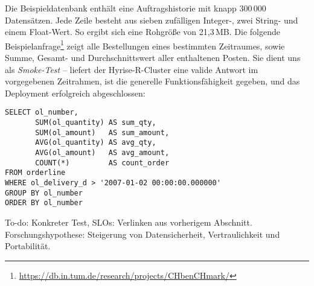 Die Beispieldatenbank enthält eine Auftragshistorie mit knapp 300\,000 Datensätzen. Jede Zeile besteht aus sieben zufälligen Integer-, zwei String- und einem Float-Wert. So ergibt sich eine Rohgröße von 21,3\,MB. Die folgende Beispielanfrage\footnote{\url{https://db.in.tum.de/research/projects/CHbenCHmark/}} zeigt alle Bestellungen eines bestimmten Zeitraumes, sowie Summe, Gesamt- und Durchschnittswert aller enthaltenen Posten. Sie dient uns als \emph{Smoke-Test} -- liefert der Hyrise-R-Cluster eine valide Antwort im vorgegebenen Zeitrahmen, ist die generelle Funktionsfähigkeit gegeben, und das Deployment erfolgreich abgeschlossen:

\begin{verbatim}
SELECT ol_number,
       SUM(ol_quantity) AS sum_qty,
       SUM(ol_amount)   AS sum_amount,
       AVG(ol_quantity) AS avg_qty,
       AVG(ol_amount)   AS avg_amount,
       COUNT(*)         AS count_order
FROM orderline 
WHERE ol_delivery_d > '2007-01-02 00:00:00.000000' 
GROUP BY ol_number
ORDER BY ol_number
\end{verbatim}

To-do: Konkreter Test, SLOs: Verlinken aus vorherigem Abschnitt. Forschungshypothese: Steigerung von  Datensicherheit, Vertraulichkeit und Portabilität.
